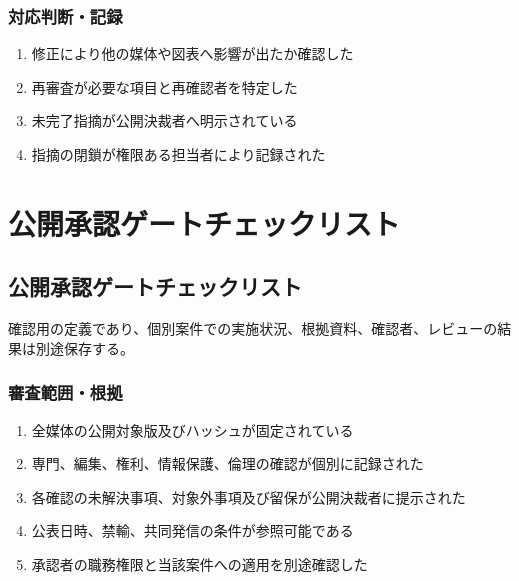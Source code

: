\documentclass[a4paper,11pt]{article}
\begin{document}
\subsubsection*{対応判断・記録}
\begin{enumerate}[leftmargin=2em,itemsep=0.3em]
\item 修正により他の媒体や図表へ影響が出たか確認した\par
\item 再審査が必要な項目と再確認者を特定した\par
\item 未完了指摘が公開決裁者へ明示されている\par
\item 指摘の閉鎖が権限ある担当者により記録された\par
\end{enumerate}
\section{公開承認ゲートチェックリスト}
\subsection{公開承認ゲートチェックリスト}
\par 確認用の定義であり、個別案件での実施状況、根拠資料、確認者、レビューの結果は別途保存する。\par\medskip
\subsubsection*{審査範囲・根拠}
\begin{enumerate}[leftmargin=2em,itemsep=0.3em]
\item 全媒体の公開対象版及びハッシュが固定されている\par
\item 専門、編集、権利、情報保護、倫理の確認が個別に記録された\par
\item 各確認の未解決事項、対象外事項及び留保が公開決裁者に提示された\par
\item 公表日時、禁輸、共同発信の条件が参照可能である\par
\item 承認者の職務権限と当該案件への適用を別途確認した\par
\end{enumerate}
\end{document}
